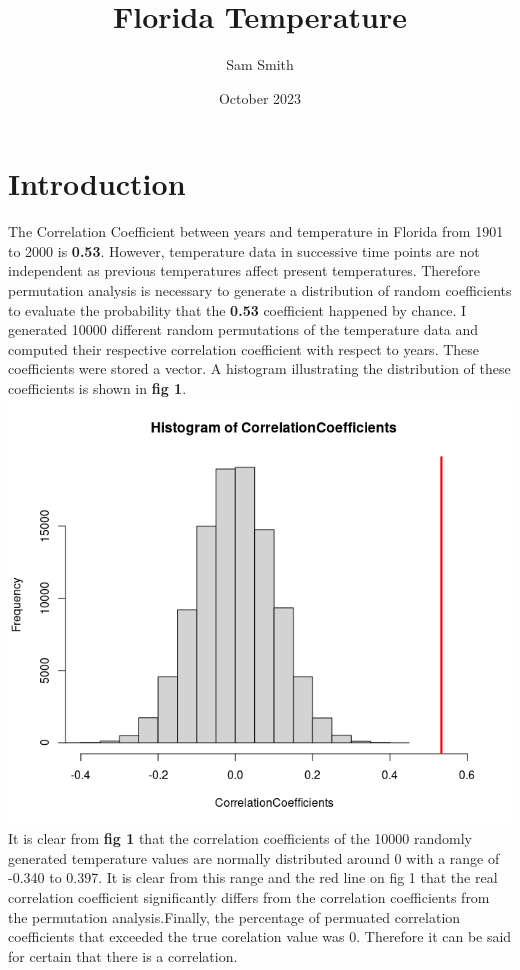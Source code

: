 \documentclass{article}
\title{Florida Temperature}
\author{Sam Smith}
\date{October 2023}
\begin{document}
\maketitle

\section{Introduction}

The Correlation Coefficient between years and temperature in Florida from 1901 to 2000 is \textbf{0.53}.
However, temperature data in successive time points are not independent as previous temperatures affect present temperatures. Therefore permutation analysis is necessary to generate a distribution of random coefficients to evaluate the probability that the \textbf{0.53} coefficient happened by chance. I generated 10000 different random permutations of the temperature data and computed their respective correlation coefficient with respect to years. These coefficients were stored a vector. A histogram illustrating the distribution of these coefficients is shown in \textbf{fig 1}.\\

\includegraphics[scale=0.4]{Hist.png}\\

It is clear from \textbf{fig 1} that the correlation coefficients of the 10000 randomly generated temperature values are normally distributed around 0 with a range of -0.340 to 0.397. It is clear from this range and the red line on fig 1 that the real correlation coefficient significantly differs from the correlation coefficients from the permutation analysis.Finally, the percentage of permuated correlation coefficients that exceeded the true corelation value was 0. Therefore it can be said for certain that there is a correlation.
\end{document}
